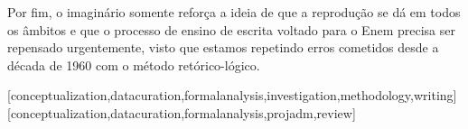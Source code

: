 \documentclass[portuguese]{textolivre}
\begin{document}
Por fim, o imaginário somente reforça a ideia de que a reprodução se dá em todos os âmbitos e que o processo de ensino de escrita voltado para o Enem precisa ser repensado urgentemente, visto que estamos repetindo erros cometidos desde a década de 1960 com o método retórico-lógico. 

\printbibliography\label{sec-bib}

\begin{contributors}
 		[conceptualization,datacuration,formalanalysis,investigation,methodology,writing]
 		[conceptualization,datacuration,formalanalysis,projadm,review]
\end{contributors}
\end{document}
